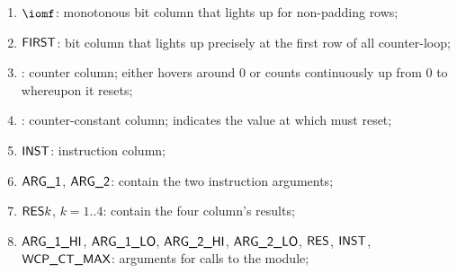 \begin{enumerate}
	\item $\iomf$:
	monotonous bit column that lights up for non-padding rows;
	\item $\textsf{FIRST}$:
		bit column that lights up precisely at the first row of all counter-loop;
	 \item \ct{}:
	counter column; 
	either hovers around $0$ or counts continuously up from $0$ to \maxCt{} whereupon it resets;
    \item \maxCt:
	counter-constant column;
	indicates the value at which \ct{} must reset;
	\item $\textsf{INST}{}$:
	\godGiven{}
	instruction column;
    \item $\textsf{ARG}\textsf{\_1}$, $\textsf{ARG}\textsf{\_2}$:
	\godGiven{}
	contain the two instruction arguments;
	\item $\textsf{RES}{k}$, $k=1..4$:
	contain the four column's results;
	\item $\textsf{ARG}\textsf{\_1}\textsf{\_HI}$, $\textsf{ARG}\textsf{\_1}\textsf{\_LO}$, $\textsf{ARG}\textsf{\_2}\textsf{\_HI}$, $\textsf{ARG}\textsf{\_2}\textsf{\_LO}$, $\textsf{RES}$, $\textsf{INST}$, $\textsf{WCP\_CT\_MAX}$:
	arguments for calls to the \wcpMod{} module;
\end{enumerate}